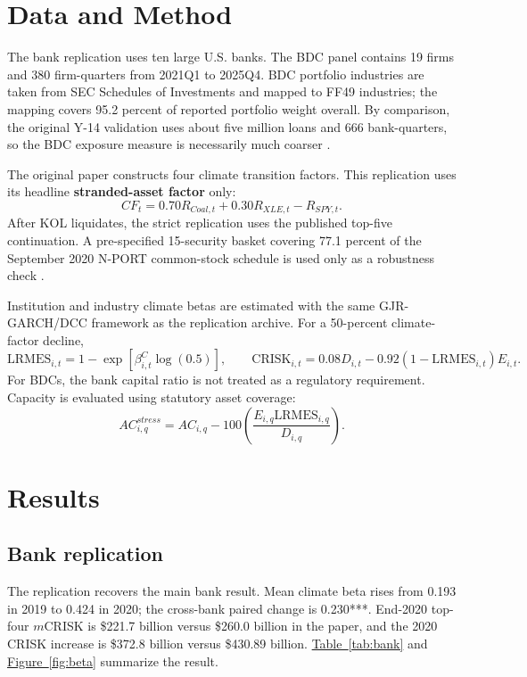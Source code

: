 \documentclass[11pt]{article}
\newcommand{\CRISK}{\mathrm{CRISK}}
\newcommand{\LRMES}{\mathrm{LRMES}}
\newcommand{\figref}[1]{\hyperref[#1]{Figure~\ref*{#1}}}
\newcommand{\tabref}[1]{\hyperref[#1]{Table~\ref*{#1}}}
\begin{document}
\section{Data and Method}

The bank replication uses ten large U.S. banks. The BDC panel contains 19 firms and 380 firm-quarters from 2021Q1 to 2025Q4. BDC portfolio industries are taken from SEC Schedules of Investments and mapped to FF49 industries; the mapping covers 95.2 percent of reported portfolio weight overall. By comparison, the original Y-14 validation uses about five million loans and 666 bank-quarters, so the BDC exposure measure is necessarily much coarser \citep{JungEngleBerner2025}.

The original paper constructs four climate transition factors. This replication uses its headline \textbf{stranded-asset factor} only:
\begin{equation}
CF_t=0.70R_{Coal,t}+0.30R_{XLE,t}-R_{SPY,t}.
\label{eq:factor}
\end{equation}
After KOL liquidates, the strict replication uses the published top-five continuation. A pre-specified 15-security basket covering 77.1 percent of the September 2020 N-PORT common-stock schedule is used only as a robustness check \citep{VanEckNPORT2020}.

Institution and industry climate betas are estimated with the same GJR-GARCH/DCC framework as the replication archive. For a 50-percent climate-factor decline,
\begin{equation}
\LRMES_{i,t}=1-\exp\left[\beta^C_{i,t}\log(0.5)\right],
\qquad
\CRISK_{i,t}=0.08D_{i,t}-0.92(1-\LRMES_{i,t})E_{i,t}.
\label{eq:crisk}
\end{equation}
For BDCs, the bank capital ratio is not treated as a regulatory requirement. Capacity is evaluated using statutory asset coverage:
\begin{equation}
AC^{stress}_{i,q}=AC_{i,q}-100\left(\frac{E_{i,q}\LRMES_{i,q}}{D_{i,q}}\right).
\label{eq:coverage}
\end{equation}

\section{Results}

\subsection{Bank replication}

The replication recovers the main bank result. Mean climate beta rises from 0.193 in 2019 to 0.424 in 2020; the cross-bank paired change is 0.230***. End-2020 top-four $m$CRISK is \$221.7 billion versus \$260.0 billion in the paper, and the 2020 CRISK increase is \$372.8 billion versus \$430.89 billion. \tabref{tab:bank} and \figref{fig:beta} summarize the result.
\end{document}

